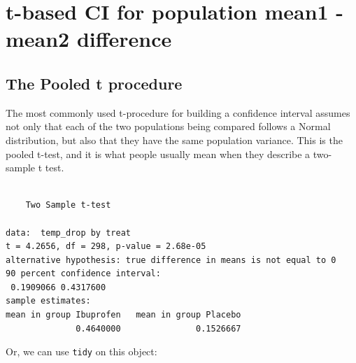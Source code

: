 \documentclass[
]{book}
\newenvironment{Shaded}{\begin{snugshade}}{\end{snugshade}}
\newcommand{\DataTypeTok}[1]{\textcolor[rgb]{0.13,0.29,0.53}{#1}}
\newcommand{\FloatTok}[1]{\textcolor[rgb]{0.00,0.00,0.81}{#1}}
\newcommand{\KeywordTok}[1]{\textcolor[rgb]{0.13,0.29,0.53}{\textbf{#1}}}
\newcommand{\NormalTok}[1]{#1}
\newcommand{\OperatorTok}[1]{\textcolor[rgb]{0.81,0.36,0.00}{\textbf{#1}}}
\newcommand{\OtherTok}[1]{\textcolor[rgb]{0.56,0.35,0.01}{#1}}
\newcommand{\StringTok}[1]{\textcolor[rgb]{0.31,0.60,0.02}{#1}}
\begin{document}
\hypertarget{t-based-ci-for-population-mean1---mean2-difference}{%
\section{t-based CI for population mean1 - mean2 difference}\label{t-based-ci-for-population-mean1---mean2-difference}}

\hypertarget{the-pooled-t-procedure}{%
\subsection{The Pooled t procedure}\label{the-pooled-t-procedure}}

The most commonly used t-procedure for building a confidence interval assumes not only that each of the two populations being compared follows a Normal distribution, but also that they have the same population variance. This is the pooled t-test, and it is what people usually mean when they describe a two-sample t test.

\begin{Shaded}
\end{Shaded}

\begin{verbatim}

	Two Sample t-test

data:  temp_drop by treat
t = 4.2656, df = 298, p-value = 2.68e-05
alternative hypothesis: true difference in means is not equal to 0
90 percent confidence interval:
 0.1909066 0.4317600
sample estimates:
mean in group Ibuprofen   mean in group Placebo 
              0.4640000               0.1526667 
\end{verbatim}

Or, we can use \texttt{tidy} on this object:

\begin{Shaded}
\end{Shaded}
\end{document}
